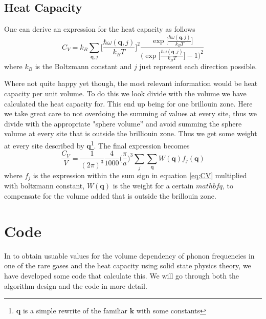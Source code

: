 \documentclass[11pt]{article}
\begin{document}
\subsection{Heat Capacity}
One can derive an expression for the heat capacity as follows\cite{bib:solid}
\begin{equation}
	C_V = k_B \sum_{\mathbf{q}, j} \Big[\frac{\hbar \omega(\mathbf{q},j)}{k_B T}\Big]^2
	\frac{\exp{\Big[\frac{\hbar \omega(\mathbf{q},j)}{k_B T}\Big]}}{\Big(\exp{\Big[\frac{\hbar \omega(\mathbf{q},j)}{k_B T}\Big]}-1\Big)^2}
	\label{eq:CV}
\end{equation}
where $k_B$ is the Boltzmann constant and $j$ just represent each direction possible. 

Where not quite happy yet though, the most relevant information would be heat capacity per unit volume. To do this we look divide with the volume we have calculated the heat capacity for. This end up being for one brillouin zone. Here we take great care to not overdoing the summing of values at every site, thus we divide with the appropriate "sphere volume'' and avoid summing the sphere volume at every site that is outside the brilliouin zone. Thus we get some weight at every site described by $\mathbf{q}$\footnote{$\mathbf{q}$ is a simple rewrite of the familiar $\mathbf{k}$ with some constants}. The final expression becomes
\begin{equation}
	\frac{C_V}{V} = \frac{1}{(2\pi)^3} \frac{4}{1000} \big(\frac{\pi}{a})^3 \sum_j \sum_{\mathbf{q}} W(\mathbf{q})f_j(\mathbf{q}) 
\end{equation}
where $f_j$ is the expression within the sum sign in equation \ref{eq:CV} multiplied with boltzmann constant, $W(\mathbf{q})$ is the weight for a certain $mathbf{q}$, to compensate for the volume added that is outside the brillouin zone. 
\section{Code}
In to obtain usuable values for the volume dependency of phonon frequencies in one of the rare gases and the heat capacity using solid state physics theory, we have developed some code that calculate this. We will go through both the algorithm design and the code in more detail. 
\end{document}
